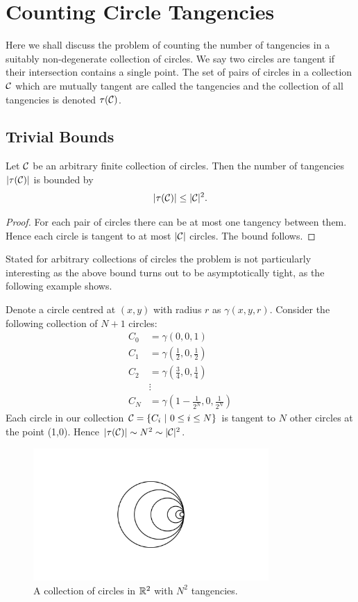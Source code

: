 \chapter{Counting Circle Tangencies\label{chap:circle}}

Here we shall discuss the problem of counting the number of tangencies in a suitably non-degenerate collection of circles. We say two circles are tangent if their intersection contains a single point.
The set of pairs of circles in a collection $\mathcal C$ which are mutually tangent are called the tangencies and the collection of all tangencies is denoted $\tau(\mathcal C)$. 
\section{Trivial Bounds}
\begin{lemma} \label{lem:trivial-circle-bound}
    Let $\mathcal C$ be an arbitrary finite collection of circles. Then the number of tangencies $|\tau(\mathcal C)|$ is bounded by
    \[
        |\tau(\mathcal C)| \leq |\mathcal C|^2.
    \] 
\end{lemma}
\begin{proof}
    For each pair of circles there can be at most one tangency between them.
    Hence each circle is tangent to at most $|\mathcal C|$ circles. The bound follows.
\end{proof}
Stated for arbitrary collections of circles the problem is not particularly interesting as the above bound turns out to be asymptotically tight, as the following example shows.
\begin{example}
Denote a circle centred at $(x,y)$ with radius $r$ as $\gamma (x,y,r)$.
Consider the following collection of $N+1$ circles:
\begin{align*}
    C_0 &= \gamma\left(0,0,1\right) \\
    C_1 &= \gamma\left(\frac{1}{2},0,\frac{1}{2}\right) \\
    C_2 &= \gamma\left(\frac{3}{4},0, \frac{1}{4}\right) \\
    &\vdots \\
    C_N &= \gamma\left(1- \frac{1}{2^N}, 0, \frac{1}{2^N}\right)
\end{align*}
Each circle in our collection $\mathcal C = \{ C_i \ | \ 0 \leq i \leq N\}$ is tangent to $N$ other circles at the point (1,0). 
Hence $|\tau(\mathcal C)| \sim N^2 \sim |\mathcal C|^2$. 
\begin{figure}[h]
    \centering 
    \includegraphics[width=0.8\textwidth]{images/circles_degen_case_ManimCE_v0.15.1.png}
    \caption{A collection of circles in $\mathbb R^2$ with $N^2$ tangencies.}
    \end{figure}
\end{example}


